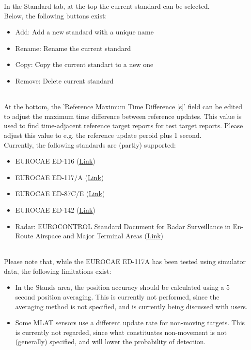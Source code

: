 In the Standard tab, at the top the current standard can be selected. \\

Below, the following buttons exist:
\begin{itemize}  
\item Add: Add a new standard with a unique name
\item Rename: Rename the current standard
\item Copy: Copy the current standart to a new one
\item Remove: Delete current standard
\end{itemize}
\ \\

At the bottom, the 'Reference Maximum Time Difference [s]' field can be edited to adjust the maximum time difference between reference updates. This value is used to find time-adjacent reference target reports for test target reports. Please adjust this value to e.g. the reference update peroid plus 1 second. \\

Currently, the following standards are (partly) supported:
\begin{itemize}  
\item EUROCAE ED-116 (\href{https://eshop.eurocae.net/eurocae-documents-and-reports/ed-116/}{Link})
\item EUROCAE ED-117/A (\href{https://eshop.eurocae.net/eurocae-documents-and-reports/ed-117a/}{Link})
\item EUROCAE ED-87C/E (\href{https://eshop.eurocae.net/eurocae-documents-and-reports/ed-87c/}{Link})
\item EUROCAE ED-142 (\href{https://eshop.eurocae.net/eurocae-documents-and-reports/ed-142/}{Link})
\item Radar: EUROCONTROL Standard Document for Radar Surveillance in En-Route Airspace and Major Terminal Areas (\href{https://www.eurocontrol.int/sites/default/files/publication/files/surveillance-standard-document-for-radar-surveillance-in-en-route-airspace-and-major-terminal-areas199703.pdf}{Link})
\end{itemize}
\ \\

Please note that, while the EUROCAE ED-117A has been tested using simulator data, the following limitations exist:
\begin{itemize}  
\item In the Stands area, the position accuracy should be calculated using a 5 second position averaging. This is currently not performed, since the averaging method is not specified, and is currently being discussed with users.
\item Some MLAT sensors use a different update rate for non-moving targets. This is currently not regarded, since what constituates non-movement is not (generally) specified, and will lower the probability of detection. 
\end{itemize}
\ \\

